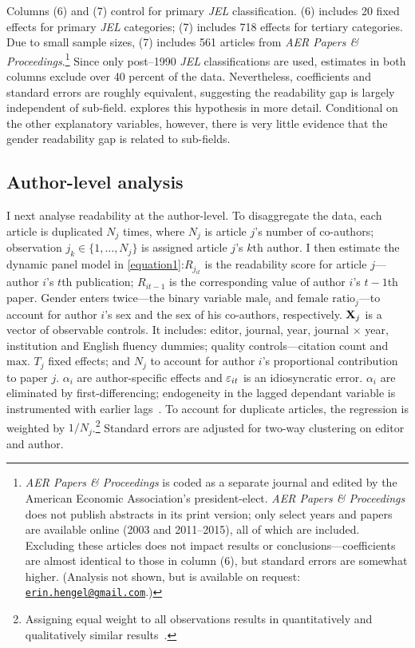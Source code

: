 Columns (6) and (7) control for primary \emph{JEL} classification. (6) includes 20 fixed effects for primary \emph{JEL} categories; (7) includes 718 effects for tertiary categories. Due to small sample sizes, (7) includes 561 articles from \emph{AER Papers \& Proceedings}.\footnote{\label{footnote34}\emph{AER Papers \& Proceedings} is coded as a separate journal and edited by the American Economic Association's president-elect. \emph{AER Papers \& Proceedings} does not publish abstracts in its print version; only select years and papers are available online (2003 and 2011--2015), all of which are included. Excluding these articles does not impact results or conclusions---coefficients are almost identical to those in column (6), but standard errors are somewhat higher. (Analysis not shown, but is available on request: \href{mailto:erin.hengel@gmail.com}{\texttt{erin.hengel@gmail.com}}.)} Since only post--1990 \emph{JEL} classifications are used, estimates in both columns exclude over 40 percent of the data. Nevertheless, coefficients and standard errors are roughly equivalent, suggesting the readability gap is largely independent of sub-field.  explores this hypothesis in more detail. Conditional on the other explanatory variables, however, there is very little evidence that the gender readability gap is related to sub-fields.

\subsection{Author-level analysis}
\label{authorlevel}

I next analyse readability at the author-level. To disaggregate the data, each article is duplicated $N_j$ times, where $N_j$ is article $j$'s number of co-authors; observation $j_k\in\{1,\ldots,N_j\}$ is assigned article $j$'s $k\text{th}$ author. I then estimate the dynamic panel model in \autoref{equation1}:$R_{j_{it}}$ is the readability score for article $j$---author $i$'s $t$th publication; $R_{it-1}$ is the corresponding value of author $i$'s $t-1$th paper. Gender enters twice---the binary variable $\text{male}_i$ and $\text{female ratio}_j$---to account for author $i$'s sex and the sex of his co-authors, respectively. $\mathbf{X}_j$ is a vector of observable controls. It includes: editor, journal, year, journal $\times$ year, institution and English fluency dummies; quality controls---citation count and $\text{max. }T_j$ fixed effects; and $N_j$ to account for author $i$'s proportional contribution to paper $j$. $\alpha_i$ are author-specific effects and $\varepsilon_{it}$ is an idiosyncratic error. $\alpha_i$ are eliminated by first-differencing; endogeneity in the lagged dependant variable is instrumented with earlier lags~\citep{Arellano1995,Blundell1998}. To account for duplicate articles, the regression is weighted by $1/N_j$.\footnote{Assigning equal weight to all observations results in quantitatively and qualitatively similar results~\citep[see][pp. 44--45]{Hengel2016}.} Standard errors are adjusted for two-way clustering on editor and author.

